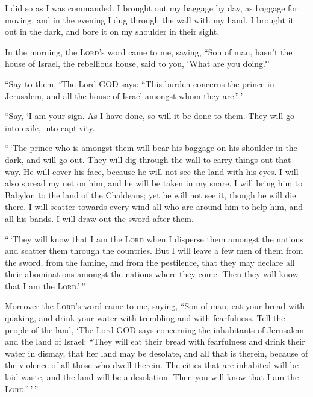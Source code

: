  I did so as I was commanded. I brought out my baggage by
day, as baggage for moving, and in the evening I dug through the wall
with my hand. I brought it out in the dark, and bore it on my shoulder
in their sight.

 In the morning, the \textsc{Lord}'s word came to me,
saying,  ``Son of man, hasn't the house of Israel, the
rebellious house, said to you, `What are you doing?'

 ``Say to them, `The Lord GOD says: ``This burden
concerns the prince in Jerusalem, and all the house of Israel amongst
whom they are.''\,'

 ``Say, `I am your sign. As I have done, so will it be
done to them. They will go into exile, into captivity.

 ``\,`The prince who is amongst them will bear his
baggage on his shoulder in the dark, and will go out. They will dig
through the wall to carry things out that way. He will cover his face,
because he will not see the land with his eyes.  I will
also spread my net on him, and he will be taken in my snare. I will
bring him to Babylon to the land of the Chaldeans; yet he will not see
it, though he will die there.  I will scatter towards
every wind all who are around him to help him, and all his bands. I will
draw out the sword after them.

 ``\,`They will know that I am the \textsc{Lord} when I
disperse them amongst the nations and scatter them through the
countries.  But I will leave a few men of them from the
sword, from the famine, and from the pestilence, that they may declare
all their abominations amongst the nations where they come. Then they
will know that I am the \textsc{Lord}.'\,''

 Moreover the \textsc{Lord}'s word came to me, saying,
 ``Son of man, eat your bread with quaking, and drink
your water with trembling and with fearfulness.  Tell the
people of the land, `The Lord GOD says concerning the inhabitants of
Jerusalem and the land of Israel: ``They will eat their bread with
fearfulness and drink their water in dismay, that her land may be
desolate, and all that is therein, because of the violence of all those
who dwell therein.  The cities that are inhabited will be
laid waste, and the land will be a desolation. Then you will know that I
am the \textsc{Lord}.''\,'\,''

